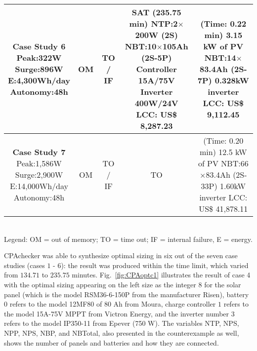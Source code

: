 \begin{table}
\begin{scriptsize}
\begin{tabular}{|c|c|c|c|c|}
\makecell{\textbf{Case Study 6}\\Peak:322W\\Surge:896W\\E:4,300Wh/day\\Autonomy:48h} & OM & TO / IF & \makecell {SAT (235.75 min) \\NTP:2$\times$200W (2S)\\NBT:10$\times$105Ah (2S-5P)\\Controller 15A/75V\\Inverter 400W/24V \\LCC: US\$ 8,287.23} & \makecell{(Time: 0.22 min)\\3.15 kW of PV\\NBT:14$\times$83.4Ah (2S-7P)\\0.328kW inverter\\LCC: US\$ 9,112.45} \\
\hline
\makecell{\textbf{Case Study 7}\\Peak:1,586W\\Surge:2,900W\\E:14,000Wh/day\\Autonomy:48h} & OM & TO / IF & TO & \makecell{(Time: 0.20 min)\\12.5 kW of PV\\NBT:66$\times$83.4Ah (2S-33P)\\1.60kW inverter\\LCC: US\$ 41,878.11} \\
\hline
\hline
\end{tabular}
\\Legend: OM = out of memory; TO = time out; IF = internal failure, E = energy.
\end{scriptsize}
\end{table}

CPAchecker was able to synthesize optimal sizing in six 
out of the seven case studies (cases $1$ - $6$): the result was produced within the time limit, which varied from $134.71$ to $235.75$ minutes. Fig.~\ref{fig:CPAoptc1} illustrates the result of case 4 with the optimal sizing appearing on the left size as the integer $8$ for the solar panel (which is the model RSM36-6-150P from the manufacturer Risen), battery $0$ refers to the model 12MF80 of 80 Ah from Moura, charge controller $1$ refers to the model 15A-75V MPPT from Victron  Energy, and the inverter number $3$ refers to the model IP350-11 from Epever (750 W). The variables NTP, NPS, NPP, NPS, NBP, and NBTotal, also presented in the counterexample as well, shows the number of panels and batteries and how they are connected.

